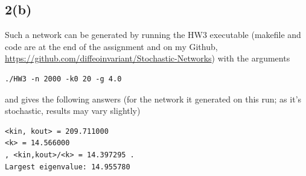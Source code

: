 \documentclass[11pt]{article}
\begin{document}
\subsection*{2(b)} Such a network can be generated by running the HW3 executable (makefile and code are at the end of the assignment and on my Github, \url{https://github.com/diffeoinvariant/Stochastic-Networks}) with the arguments 
\begin{Verbatim}
./HW3 -n 2000 -k0 20 -g 4.0
\end{Verbatim}
and gives the following answers (for the network it generated on this run; as it's stochastic, results may vary slightly)
\begin{Verbatim}
<kin, kout> = 209.711000 
<k> = 14.566000 
, <kin,kout>/<k> = 14.397295 .
Largest eigenvalue: 14.955780
\end{Verbatim}
\end{document}
